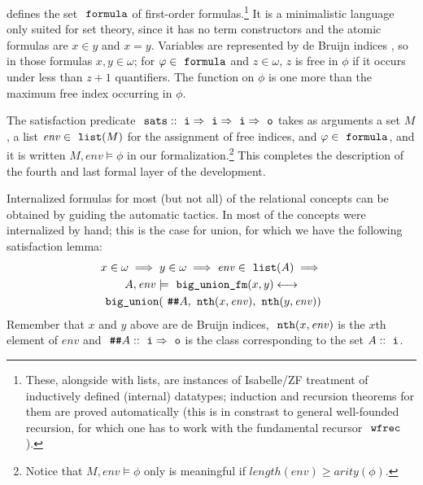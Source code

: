  defines the set $\formula$ of first-order
formulas.\footnote{These, alongside with lists, are instances of
  Isabelle/ZF treatment of inductively defined (internal) datatypes;
  induction and recursion theorems for them are proved automatically
  (this is in constrast to general well-founded recursion, for which
  one has to work with the fundamental recursor $\isatt{wfrec}$).}  It
is a minimalistic language only suited for set theory, since it has no
term constructors and the atomic formulas are $x \in y$ and $x = y$.
Variables are represented by de Bruijn indices \cite{MR0321704}, so in
those formulas $x,y \in \omega$; for $\phi\in\formula$ and
$z\in\omega$, $z$ is free in $\phi$ if it occurs under less than $z+1$
quantifiers. The  function on $\phi$ is one more than the
maximum free index occurring in $\phi$.

The satisfaction predicate
$\isatt{sats}::\tyi\fun\tyi\fun\tyi\fun\tyo$ takes as arguments a set
$M$, a list $\mathit{env}\in\isatt{list}(M)$ for the assignment of
free indices, and $\phi\in\formula$, and it is written
$M,\mathit{env}\models\phi$ in our formalization.\footnote{Notice that
  $M,\mathit{env}\models\phi$ only is meaningful if
  $\mathit{length(env)} \geqslant arity(\phi)$.} This completes the
description of the fourth and last formal layer of the development.

Internalized formulas for most (but not all) of the relational
concepts can be obtained by guiding the automatic tactics. In
 most of the concepts were internalized by
hand; this is the case for union,
for which we have the following satisfaction lemma:
\begin{multline}\label{eq:sats_big_union_fm}
  x \in \omega \implies y \in \omega \implies \mathit{env} \in \isatt{list}(A)
  \implies \\
  A, \mathit{env} \models \isatt{big{\uscore}union{\uscore}fm}(x,y)%
  \longleftrightarrow \\
  \isatt{big{\uscore}union}(\isatt{\#\#} A, \isatt{nth}(x,
  \mathit{env}), \isatt{nth}(y, \mathit{env}))
\end{multline}
Remember that $x$ and $y$ above are de Bruijn indices,
$\isatt{nth}(x,\mathit{env})$ is the $x$th element of $\mathit{env}$
and $\isatt{\#\#}A::\tyi\fun \tyo$ is the class corresponding to the
set $A::\tyi$.

